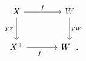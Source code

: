 \[
\begin{tikzcd}[column sep=large,row sep=large]
  X
    \arrow[r,"f"]
    \arrow[d,"p_X"']
  &
  W
    \arrow[d,"p_W"]
  \\
  X^+
    \arrow[r,"f^+"']
  &
  W^+.
\end{tikzcd}
\]
